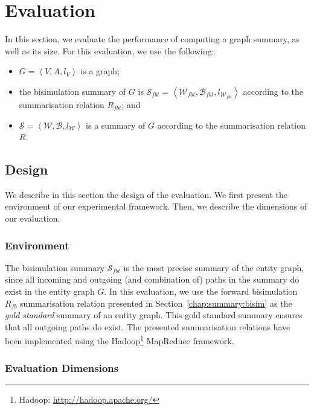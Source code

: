 \section{Evaluation}
\label{sec:summary:eval}

In this section, we evaluate the performance of computing a graph summary, as well as its size.
For this evaluation, we use the following:
\begin{itemize}
	\item $G=\left\langle V, A, l_V \right\rangle$ is a graph;
	\item the bisimulation summary of $G$ is $\mathcal{S}_{fbt} = \left\langle \mathcal{W}_{fbt}, \mathcal{B}_{fbt}, l_{\mathcal{W}_{fbt}} \right\rangle$ according to the summarisation relation $R_{fbt}$; and
	\item $\mathcal{S} = \left\langle \mathcal{W}, \mathcal{B}, l_{\mathcal{W}} \right\rangle$ is a summary of $G$ according to the summarisation relation $R$.
\end{itemize}

\subsection{Design}
\label{sec:eval:design}

We describe in this section the design of the evaluation. We first present the environment of our experimental framework. Then, we describe the dimensions of our evaluation.

\subsubsection{Environment}

The bisimulation summary $\mathcal{S}_{fbt}$ is the most precise summary of the entity graph, since all incoming and outgoing (and combination of) paths in the summary do exist in the entity graph $G$. In this evaluation, we use the forward bisimulation $R_{fb}$ summarisation relation presented in Section~\ref{chap:summary:bisim} as the \emph{gold standard} summary of an entity graph. This gold standard summary ensures that all outgoing paths do exist. The presented summarisation relations have been implemented using the Hadoop\footnote{Hadoop: \url{http://hadoop.apache.org/}} MapReduce framework.

\subsubsection{Evaluation Dimensions}

